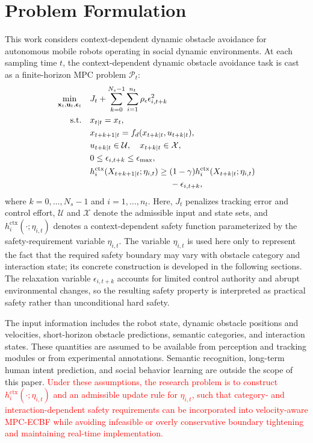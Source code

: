 \documentclass[journal]{IEEEtranTIE}
\begin{document}
\section{Problem Formulation} \label{sec:problem_formulation}
This work considers context-dependent dynamic obstacle avoidance for
autonomous mobile robots operating in social dynamic environments. At each sampling time $t$, the context-dependent dynamic obstacle avoidance
task is cast as a finite-horizon MPC problem $\mathcal{P}_t$:
\begin{equation}
\begin{aligned}
\min_{\mathbf{x}_t,\mathbf{u}_t,\boldsymbol{\epsilon}_t}\quad
& J_t + \sum_{k=0}^{N_s-1}\sum_{i=1}^{n_t}\rho_{\epsilon}
\epsilon_{i,t+k}^2 \\
\mathrm{s.t.}\quad
& x_{t|t}=x_t, \\
& x_{t+k+1|t}=f_d(x_{t+k|t},u_{t+k|t}), \\
& u_{t+k|t}\in\mathcal{U},\quad x_{t+k|t}\in\mathcal{X}, \\
& 0\le \epsilon_{i,t+k}\le \epsilon_{\max},\\
& h^{\mathrm{ctx}}_i(X_{t+k+1|t};\eta_{i,t})
  \ge (1-\gamma)h^{\mathrm{ctx}}_i(X_{t+k|t};\eta_{i,t}) \\
& \hspace{9.5em}{}-\epsilon_{i,t+k}, 
\end{aligned}
\label{eq:problem_formulation}
\end{equation}
where $k=0,\ldots,N_s-1$ and $i=1,\ldots,n_t$.
Here, $J_t$ penalizes tracking error and control effort, $\mathcal{U}$ and
$\mathcal{X}$ denote the admissible input and state sets, and
$h^{\mathrm{ctx}}_i(\cdot;\eta_{i,t})$ denotes a context-dependent safety
function parameterized by the safety-requirement variable $\eta_{i,t}$.
The variable $\eta_{i,t}$ is used here only to represent the fact that the
required safety boundary may vary with obstacle category and interaction
state; its concrete construction is developed in the following sections.
The relaxation variable $\epsilon_{i,t+k}$ accounts for limited control
authority and abrupt environmental changes, so the resulting safety property
is interpreted as practical safety rather than unconditional hard safety.

The input information includes the robot state, dynamic obstacle positions
and velocities, short-horizon obstacle predictions, semantic categories, and
interaction states. These quantities are assumed to be available from
perception and tracking modules or from experimental annotations. Semantic
recognition, long-term human intent prediction, and social behavior learning
are outside the scope of this paper. \textcolor{red}{Under these assumptions, the research problem is to construct
$h^{\mathrm{ctx}}_i(\cdot;\eta_{i,t})$ and an admissible update rule for
$\eta_{i,t}$, such that category- and interaction-dependent safety
requirements can be incorporated into velocity-aware MPC-ECBF while avoiding
infeasible or overly conservative boundary tightening and maintaining
real-time implementation.}
\end{document}
